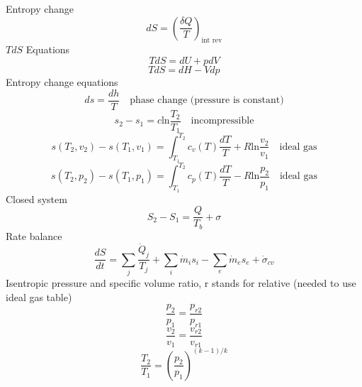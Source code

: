 \documentclass[paper=letter, fontsize=11pt]{scrartcl}
\numberwithin{equation}{section}        %
\numberwithin{figure}{section}          %
\numberwithin{table}{section}               %
\begin{document}
Entropy change
\begin{equation}
    d S = \left(\frac{\delta Q}{T}\right)_\text{int rev}
\end{equation}
\newline
\newline
$TdS$ Equations
\begin{equation}
    T dS = dU + p dV
\end{equation}
\begin{equation}
    T dS = dH - V dp
\end{equation}
\newline
\newline
Entropy change equations
\begin{equation}
    ds = \frac{dh}{T}\quad\text{phase change (pressure is constant)}
\end{equation}
\begin{equation}
    s_2-s_1 = c \text{ln}\frac{T_2}{T_1}\quad\text{incompressible}
\end{equation}
\begin{equation}
    s(T_2,v_2)-s(T_1,v_1) = \int_{T_1}^{T_2}c_v(T)\frac{dT}{T} + R \text{ln}\frac{v_2}{v_1}  \quad\text{ideal gas}
\end{equation}
\begin{equation}
    s(T_2,p_2)-s(T_1,p_1) = \int_{T_1}^{T_2}c_p(T)\frac{dT}{T} - R \text{ln}\frac{p_2}{p_1}  \quad\text{ideal gas}
\end{equation}
\newline
\newline
Closed system
\begin{equation}
    S_2-S_1 = \frac{Q}{T_b}+\sigma
\end{equation}
\newline
\newline
Rate balance
\begin{equation}
    \frac{dS}{dt} = \sum_j \frac{\dot Q_j}{T_j} + \sum_i \dot m_i s_i - \sum_e \dot m_e s_e +\dot\sigma_{cv}
\end{equation}
\newline
\newline
Isentropic pressure and specific volume ratio, r stands for relative (needed to use ideal gas table)
\begin{equation}
    \frac{p_2}{p_1}=\frac{p_{r2}}{p_{r1}}
\end{equation}
\begin{equation}
    \frac{v_2}{v_1}=\frac{v_{r2}}{v_{r1}}
\end{equation}
\begin{equation}
    \frac{T_2}{T_1} = \left(\frac{p_2}{p_1}\right)^{(k-1)/k}
\end{equation}
\end{document}
